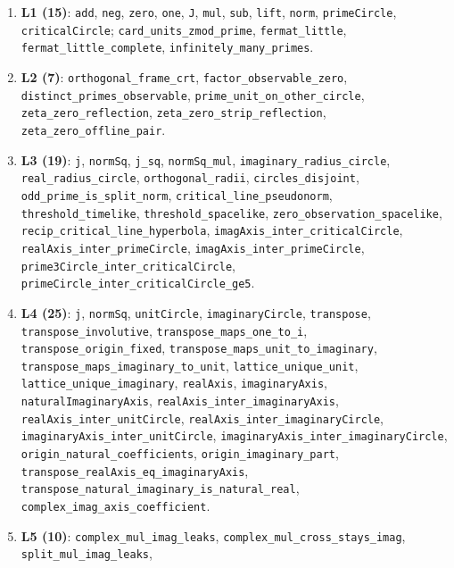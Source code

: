 \documentclass{article}
\begin{document}
{\small\begin{sloppypar}
\begin{enumerate}
\item \textbf{L1 (15)}: \texttt{add}, \texttt{neg}, \texttt{zero},
\texttt{one}, \texttt{J}, \texttt{mul}, \texttt{sub}, \texttt{lift},
\texttt{norm}, \texttt{primeCircle}, \texttt{criticalCircle};
\texttt{card\_units\_zmod\_prime}, \texttt{fermat\_little},
\texttt{fermat\_little\_complete}, \texttt{infinitely\_many\_primes}.
\item \textbf{L2 (7)}: \texttt{orthogonal\_frame\_crt},
\texttt{factor\_observable\_zero}, \texttt{distinct\_primes\_observable},
\texttt{prime\_unit\_on\_other\_circle}, \texttt{zeta\_zero\_reflection},
\texttt{zeta\_zero\_strip\_reflection}, \texttt{zeta\_zero\_offline\_pair}.
\item \textbf{L3 (19)}: \texttt{j}, \texttt{normSq}, \texttt{j\_sq},
\texttt{normSq\_mul}, \texttt{imaginary\_radius\_circle},
\texttt{real\_radius\_circle}, \texttt{orthogonal\_radii},
\texttt{circles\_disjoint}, \texttt{odd\_prime\_is\_split\_norm},
\texttt{critical\_line\_pseudonorm}, \texttt{threshold\_timelike},
\texttt{threshold\_spacelike}, \texttt{zero\_observation\_spacelike},
\texttt{recip\_critical\_line\_hyperbola},
\texttt{imagAxis\_inter\_criticalCircle}, \texttt{realAxis\_inter\_primeCircle},
\texttt{imagAxis\_inter\_primeCircle},
\texttt{prime3Circle\_inter\_criticalCircle},
\texttt{primeCircle\_inter\_criticalCircle\_ge5}.
\item \textbf{L4 (25)}: \texttt{j}, \texttt{normSq}, \texttt{unitCircle},
\texttt{imaginaryCircle}, \texttt{transpose},
\texttt{transpose\_involutive}, \texttt{transpose\_maps\_one\_to\_i},
\texttt{transpose\_origin\_fixed}, \texttt{transpose\_maps\_unit\_to\_imaginary},
\texttt{transpose\_maps\_imaginary\_to\_unit},
\texttt{lattice\_unique\_unit}, \texttt{lattice\_unique\_imaginary},
\texttt{realAxis}, \texttt{imaginaryAxis}, \texttt{naturalImaginaryAxis},
\texttt{realAxis\_inter\_imaginaryAxis},
\texttt{realAxis\_inter\_unitCircle}, \texttt{realAxis\_inter\_imaginaryCircle},
\texttt{imaginaryAxis\_inter\_unitCircle},
\texttt{imaginaryAxis\_inter\_imaginaryCircle},
\texttt{origin\_natural\_coefficients}, \texttt{origin\_imaginary\_part},
\texttt{transpose\_realAxis\_eq\_imaginaryAxis},
\texttt{transpose\_natural\_imaginary\_is\_natural\_real},
\texttt{complex\_imag\_axis\_coefficient}.
\item \textbf{L5 (10)}: \texttt{complex\_mul\_imag\_leaks},
\texttt{complex\_mul\_cross\_stays\_imag}, \texttt{split\_mul\_imag\_leaks},

\end{enumerate}
\end{sloppypar}}
\end{document}
